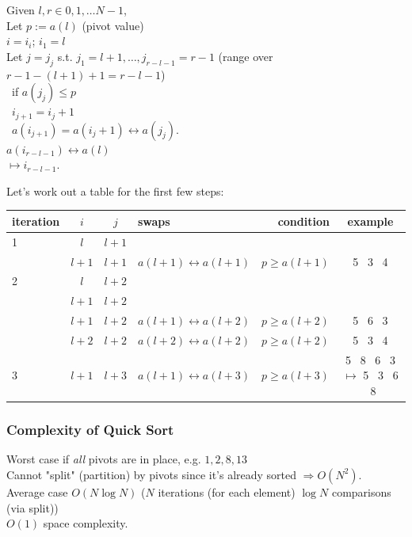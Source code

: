 \documentclass[10pt]{amsart}
\begin{document}
\begin{multicols*}{2}
Given $l, r \in 0,1,\dots N-1$, \\
Let $p:= a(l)$ (pivot value) \\
$i=i_i$; $i_1=l$ \\
Let $j=j_j$ s.t. $j_1=l+1, \dots , j_{r-l-1} = r-1$ (range over $r-1 - (l+1)+1 = r-l-1$) \\
\qquad \, if $a(j_j) \leq p$ \\
\qquad \, \phantom{if} $i_{j+1} = i_j+1$ \\
\qquad \, \phantom{if} $a(i_{j+1}) = a(i_j+1) \leftrightarrow a(j_j)$. \\

$a(i_{r-l-1}) \leftrightarrow a(l)$ \\
$\mapsto i_{r-l-1}$.

Let's work out a table for the first few steps:
\begin{center}
	\begin{tabular}{ l | c | c | l | r | c }
		\hline
		iteration & $i$ & $j$ & swaps & condition & example \\ \hline
		1 & $l$ & $l+1$ & & & \\ \hline
		& $l + 1$ &  $l + 1$ & $a(l + 1) \leftrightarrow a(l+1)$ & $p\geq a(l+1)$ & 5 \, 3 \, 4 \\
		2 & $l$ & $l+2$ & & & \\
		& $l+1$ & $l+2$ & & & \\
		& $l + 1$ & $l+2$ & $a(l+1) \leftrightarrow a(l+2)$ & $p \geq a(l+2)$ & 5 \, 6 \, 3 \\
		& $l + 2$ & $l+ 2$ & $a(l+2) \leftrightarrow a(l+2)$ & $p \geq a(l+2)$ & 5 \, 3 \, 4 \\
		3 & $l+1$ & $l+3$ & $a(l+1) \leftrightarrow a(l+3)$ & $p\geq a(l+3)$ & 5 \, 8 \, 6 \, 3 $\mapsto $ 5 \, 3 \, 6 \, 8 \\
		\hline
	\end{tabular}
\end{center}

\subsubsection{Complexity of Quick Sort}

Worst case if \emph{all} pivots are in place, e.g. $1,2,8,13$ \\
Cannot "split" (partition) by pivots since it's already sorted $\Longrightarrow O(N^2)$. \\
Average case $O(N\log{N})$ ($N$ iterations (for each element) $\log{N}$ comparisons (via split)) \\
$O(1)$ space complexity.


\end{multicols*}
\end{document}
